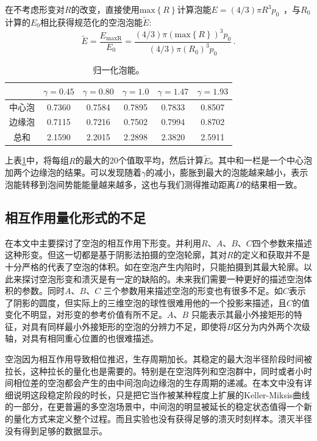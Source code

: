 在不考虑形变对$R$的改变，直接使用$\text{max}\left\{R\right\}$计算泡能$E=(4/3)\pi R^3 p_0$~，与$R_0$计算的$E_\text{0}$相比获得规范化的空泡泡能$\tilde{E}$:
\[\tilde{E}=\frac {E_\text{maxR}}{E_\text{0}}=\frac {(4/3)\pi (\text{max}\left\{R\right\})^3 p_0}{(4/3)\pi (R_\text{0})^3 p_0}\,.\]

\begin{table}[]
    \centering
    \begin{tabular}{|c|c|c|c|c|c|}
    \hline
         &\textbf{$\gamma=0.45$}& \textbf{$\gamma=0.80$}& \textbf{$\gamma=1.0$}& \textbf{$\gamma=1.47$}& \textbf{$\gamma=1.93$} \\
         \hline
         中心泡 & 0.7360 & 0.7584 & 0.7895 & 0.7833 & 0.8507 \\
         \hline
边缘泡 & 0.7115 & 0.7216 & 0.7502 & 0.7994 & 0.8702 \\
\hline
总和 & 2.1590 & 2.2015 & 2.2898 & 2.3820 & 2.5911 \\
         \hline
    \end{tabular}
    \caption{归一化泡能。}
    \label{tab4.1}
\end{table}


上表\ref{tab4.1}中，将每组$R$的最大的20个值取平均，然后计算$\tilde{E}$。其中和一栏是一个中心泡加两个边缘泡的结果。可以发现随着$\gamma$的减小，膨胀到最大的泡能越来越小，表示泡能转移到泡间势能能量越来越多，这也与我们测得推动距离$\tilde{D}$的结果相一致。

\subsection{相互作用量化形式的不足}


在本文中主要探讨了空泡的相互作用下形变。并利用$R$、$A$、$B$、$C$四个参数来描述这种形变。但这一切都是基于阴影法拍摄的空泡轮廓，其对$R$的定义和获取并不是十分严格的代表了空泡的体积。如在空泡产生内陷时，只能拍摄到其最大轮廓。以此来探讨空泡形变和溃灭是有一定的缺陷的。未来我们需要一种更好的描述空泡体积的参数。同时$A$、$B$、$C$
三个参数用来描述空泡的形变也有很多不足。如$C$表示了阴影的圆度，但实际上的三维空泡的球性很难用他的一个投影来描述，且$C$的值变化不明显，对形变的参考价值有所不足。$A$、$B$
只能表示其最小外接矩形的特征，对具有同样最小外接矩形的空泡的分辨力不足，即使将$B$区分为内外两个次级轴，对具有相同重心位置的也很难描述。

空泡因为相互作用导致相位推迟，生存周期加长。其稳定的最大泡半径阶段时间被拉长，这种拉长的量化也是需要的。特别是在空泡阵列和空泡群中，同时或者小时间相位差的空泡都会产生的由中间泡向边缘泡的生存周期的递减。在本文中没有详细说明这段稳定阶段的时长，只是把它当作被某种程度上扩展的Keller-Miksis曲线的一部分，在更普遍的多空泡场景中，中间泡的明显被延长的稳定状态值得一个新的量化方式来定义整个过程。而且实验也没有获得足够的溃灭时刻样本。溃灭半径没有得到足够的数据显示。

